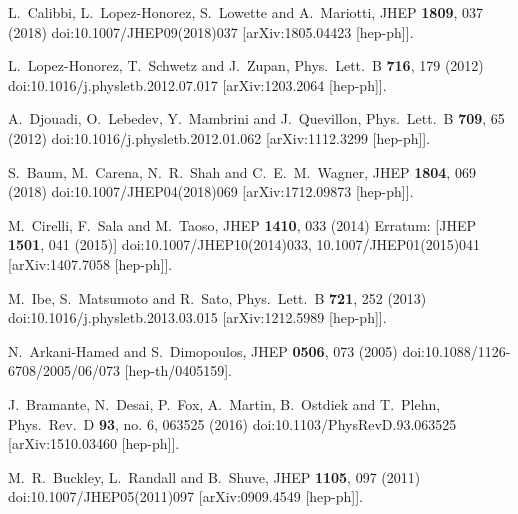 \documentclass[nofootinbib,prd,aps,superscriptaddress,preprintnumbers]{revtex4}
\begin{document}
\begin{thebibliography}{99}
  L.~Calibbi, L.~Lopez-Honorez, S.~Lowette and A.~Mariotti,
  JHEP {\bf 1809}, 037 (2018)
  doi:10.1007/JHEP09(2018)037
  [arXiv:1805.04423 [hep-ph]].

  L.~Lopez-Honorez, T.~Schwetz and J.~Zupan,
  Phys.\ Lett.\ B {\bf 716}, 179 (2012)
  doi:10.1016/j.physletb.2012.07.017
  [arXiv:1203.2064 [hep-ph]].

  A.~Djouadi, O.~Lebedev, Y.~Mambrini and J.~Quevillon,
  Phys.\ Lett.\ B {\bf 709}, 65 (2012)
  doi:10.1016/j.physletb.2012.01.062
  [arXiv:1112.3299 [hep-ph]].

  S.~Baum, M.~Carena, N.~R.~Shah and C.~E.~M.~Wagner,
  JHEP {\bf 1804}, 069 (2018)
  doi:10.1007/JHEP04(2018)069
  [arXiv:1712.09873 [hep-ph]].

  M.~Cirelli, F.~Sala and M.~Taoso,
  JHEP {\bf 1410}, 033 (2014)
  Erratum: [JHEP {\bf 1501}, 041 (2015)]
  doi:10.1007/JHEP10(2014)033, 10.1007/JHEP01(2015)041
  [arXiv:1407.7058 [hep-ph]].

  M.~Ibe, S.~Matsumoto and R.~Sato,
  Phys.\ Lett.\ B {\bf 721}, 252 (2013)
  doi:10.1016/j.physletb.2013.03.015
  [arXiv:1212.5989 [hep-ph]].

  N.~Arkani-Hamed and S.~Dimopoulos,
  JHEP {\bf 0506}, 073 (2005)
  doi:10.1088/1126-6708/2005/06/073
  [hep-th/0405159].

  J.~Bramante, N.~Desai, P.~Fox, A.~Martin, B.~Ostdiek and T.~Plehn,
  Phys.\ Rev.\ D {\bf 93}, no. 6, 063525 (2016)
  doi:10.1103/PhysRevD.93.063525
  [arXiv:1510.03460 [hep-ph]].

  M.~R.~Buckley, L.~Randall and B.~Shuve,
  JHEP {\bf 1105}, 097 (2011)
  doi:10.1007/JHEP05(2011)097
  [arXiv:0909.4549 [hep-ph]].


\end{thebibliography}
\end{document}
